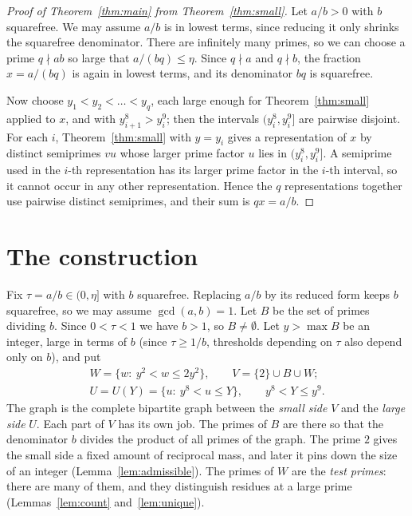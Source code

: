\documentclass[11pt]{amsart}
\theoremstyle{definition}
\theoremstyle{remark}
\begin{document}
\begin{proof}[Proof of Theorem~\ref{thm:main} from Theorem~\ref{thm:small}]
Let $a/b>0$ with $b$ squarefree. We may assume $a/b$ is in lowest terms, since reducing it only shrinks the squarefree denominator. There are infinitely many primes, so we can choose a prime $q\nmid ab$ so large that $a/(bq)\le\eta$. Since $q\nmid a$ and $q\nmid b$, the fraction $x=a/(bq)$ is again in lowest terms, and its denominator $bq$ is squarefree.

Now choose $y_1<y_2<\dots<y_q$, each large enough for Theorem~\ref{thm:small} applied to $x$, and with $y_{i+1}^8>y_i^9$; then the intervals $(y_i^8,y_i^9]$ are pairwise disjoint. For each $i$, Theorem~\ref{thm:small} with $y=y_i$ gives a representation of $x$ by distinct semiprimes $vu$ whose larger prime factor $u$ lies in $(y_i^8,y_i^9]$. A semiprime used in the $i$-th representation has its larger prime factor in the $i$-th interval, so it cannot occur in any other representation. Hence the $q$ representations together use pairwise distinct semiprimes, and their sum is $qx=a/b$.
\end{proof}

\section{The construction}\label{sec:construction}

Fix $\tau=a/b\in(0,\eta]$ with $b$ squarefree. Replacing $a/b$ by its reduced form keeps $b$ squarefree, so we may assume $\gcd(a,b)=1$. Let $B$ be the set of primes dividing $b$. Since $0<\tau<1$ we have $b>1$, so $B\ne\emptyset$. Let $y>\max B$ be an integer, large in terms of $b$ (since $\tau\ge1/b$, thresholds depending on $\tau$ also depend only on $b$), and put
\begin{gather*}
 W=\{w:\ y^2<w\le 2y^2\},\qquad V=\{2\}\cup B\cup W;\\
 U=U(Y)=\{u:\ y^8<u\le Y\},\qquad y^8<Y\le y^9.
\end{gather*}
The graph is the complete bipartite graph between the \emph{small side} $V$ and the \emph{large side} $U$. Each part of $V$ has its own job. The primes of $B$ are there so that the denominator $b$ divides the product of all primes of the graph. The prime $2$ gives the small side a fixed amount of reciprocal mass, and later it pins down the size of an integer (Lemma~\ref{lem:admissible}). The primes of $W$ are the \emph{test primes}: there are many of them, and they distinguish residues at a large prime (Lemmas~\ref{lem:count} and~\ref{lem:unique}).
\end{document}
